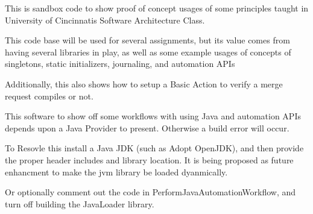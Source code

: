 This is sandbox code to show proof of concept usages of some principles taught in University of Cincinnati\textquotesingle{}s Software Architecture Class.

This code base will be used for several assignments, but it\textquotesingle{}s value comes from having several libraries in play, as well as some example usages of concepts of singletons, static initializers, journaling, and automation APIs

Additionally, this also shows how to setup a Basic Action to verify a merge request compiles or not.

This software to show off some workflows with using Java and automation APIs depends upon a Java Provider to present. Otherwise a build error will occur.

To Resovle this install a Java JDK (such as Adopt Open\+JDK), and then provide the proper header includes and library location. It is being proposed as future enhancment to make the jvm library be loaded dyanmically.

Or optionally comment out the code in Perform\+Java\+Automation\+Workflow, and turn off building the Java\+Loader library. 